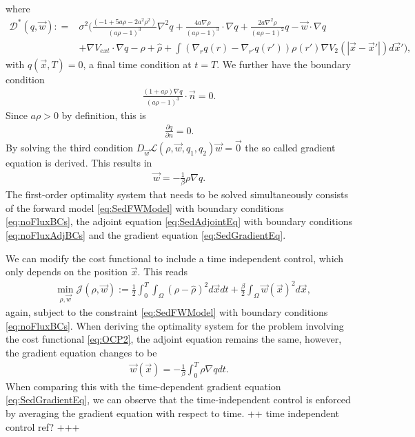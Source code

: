 \documentclass[final]{siamltex}
\newcommand{\adj}{q}
\newcommand{\w}{\vec{w}}
\newcommand{\n}{\vec{n}}
\newcommand{\x}{\vec{x}}
\newcommand{\hr}{\widehat \rho}
\begin{document}
where
\begin{align*}
	\mathcal{D}^*(\adj,\w): =& \sigma^2 \bigg(\frac{(-1 + 5 a \rho - 2 a^2 \rho^2) }{(a \rho -1)^3}\nabla^2 q + \frac{4 a \nabla \rho }{(a \rho -1)^3}\cdot \nabla q + \frac{2 a   \nabla^2 \rho}{(a \rho -1)^2} q - \w \cdot \nabla q \\
	&+ \nabla V_{ext} \cdot \nabla q 
	- \rho + \hr + \int \left(\nabla_r q(r) - \nabla_{r'} q(r') \right) \rho(r') \nabla V_2(|\x -\x'|) d\x' \bigg),
\end{align*}
with $q(\x,T) =0$, a final time condition at $t =T$.
We further have the boundary condition
\begin{align*}
	\frac{(1 + a \rho) \nabla q}{(a \rho -1)^3}\cdot \n = 0.
\end{align*}
Since $a \rho >0$ by definition, this is
\begin{align}\label{eq:noFluxAdjBCs}
	\frac{\partial q}{\partial n} = 0.
\end{align}
By solving the third condition $D_{\w} \mathcal{L} (\rho,\w,\adj_1, \adj_2)\w = \vec 0$ the so called gradient equation is derived. This results in
\begin{align}\label{eq:SedGradientEq}
	\w = - \frac{1}{\beta}\rho \nabla q.
\end{align}
The first-order optimality system that needs to be solved simultaneously consists of the forward model \eqref{eq:SedFWModel} with boundary conditions \eqref{eq:noFluxBCs}, the adjoint equation \eqref{eq:SedAdjointEq} with boundary conditions \eqref{eq:noFluxAdjBCs} and the gradient equation \eqref{eq:SedGradientEq}.

We can modify the cost functional to include a time independent control, which only depends on the position $\x$. This reads
\begin{align}\label{eq:OCP2}
	& \min_{\rho,\w}\mathcal J(\rho, \w) := \frac{1}{2}\int_0^T \int_\Omega (\rho - \widehat \rho)^2 d\x dt + \frac{\beta}{2} \int_\Omega \w(\x)^2 d\x,
\end{align}
again, subject to the constraint \eqref{eq:SedFWModel} with boundary conditions \eqref{eq:noFluxBCs}.
When deriving the optimality system for the problem involving the cost functional \eqref{eq:OCP2}, the adjoint equation remains the same, however, the gradient equation changes to be
\begin{align} \label{eq:SedGradientEq2}
	\w(\x) = - \frac{1}{\beta} \int_0^T \rho  \nabla q dt.
\end{align}
When comparing this with the time-dependent gradient equation \eqref{eq:SedGradientEq}, we can observe that the time-independent control is enforced by averaging the gradient equation with respect to time. ++ time independent control ref? +++
\end{document}
